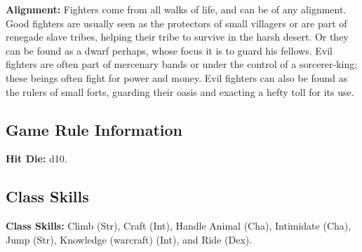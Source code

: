\textbf{Alignment:} Fighters come from all walks of life, and can be of any alignment. Good fighters are usually seen as the protectors of small villagers or are part of renegade slave tribes, helping their tribe to survive in the harsh desert. Or they can be found as a dwarf perhaps, whose focus it is to guard his fellows. Evil fighters are often part of mercenary bands or under the control of a sorcerer‐king; these beings often fight for power and money. Evil fighters can also be found as the rulers of small forts, guarding their oasis and exacting a hefty toll for its use.


\subsection{Game Rule Information}
\textbf{Hit Die:} d10.

\subsection{Class Skills}
\textbf{Class Skills:} Climb (Str), Craft (Int), Handle Animal (Cha), Intimidate (Cha), Jump (Str), Knowledge (warcraft) (Int), and Ride (Dex).


